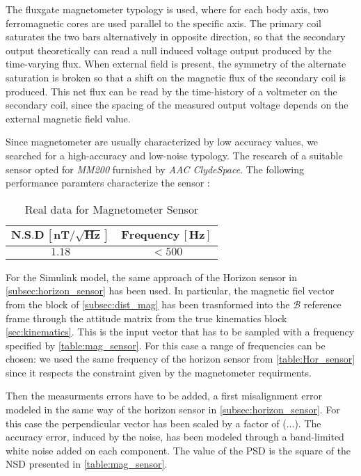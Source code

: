 The fluxgate magnetometer typology is used, where for each body axis, two ferromagnetic cores are used parallel to the specific axis. The primary coil 
saturates the two bars alternatively in opposite direction, so that the secondary output theoretically can read a null induced voltage output produced 
by the time-varying flux. When external field is present, the symmetry of the alternate saturation is broken so that a shift on the magnetic flux of the 
secondary coil is produced. This net flux can be read by the time-history of a voltmeter on the secondary coil, since the spacing of the measured output
voltage depends on the external magnetic field value. 

Since magnetometer are usually characterized by low accuracy values, we searched for a high-accuracy and low-noise typology. The research of a suitable
sensor opted for \textit{MM200} furnished by \textit{AAC ClydeSpace}. The following performance paramters characterize the sensor \cite{magnetometer_site}:

\begin{table}[H]

    \centering
    \begin{tabular}{|c|c|}
    \hline
     $\bm{N.S.D \, [nT/\sqrt{Hz}]}$ & $\bm{Frequency \, [Hz]}$ \\
    \hline
    $1.18$ & $<500$  \\
    \hline
    \end{tabular}
    
    \caption{Real data for Magnetometer Sensor}
    \label{table:mag_sensor}
    
\end{table}

For the Simulink model, the same approach of the Horizon sensor in \autoref{subsec:horizon_sensor} has been used. In particular, the magnetic fiel vector
from the block of \autoref{subsec:dist_mag} has been trasnformed into the $\mathcal{B}$ reference frame through the attitude matrix from the true kinematics 
block \autoref{sec:kinematics}. This is the input vector that has to be sampled with a frequency specified by \autoref{table:mag_sensor}. For this case a range
of frequencies can be chosen: we used the same frequency of the horizon sensor from \autoref{table:Hor_sensor} since it respects the constraint 
given by the magnetometer requirments. 

Then the measurments errors have to be added, a first misalignment error modeled in the same way of the horizon sensor in \autoref{subsec:horizon_sensor}. For this case the perpendicular
vector has been scaled by a factor of (...).
The accuracy error, induced by the noise, has been modeled through a band-limited white noise added on each component. The value of the PSD is the square of 
the NSD presented in \autoref{table:mag_sensor}.


